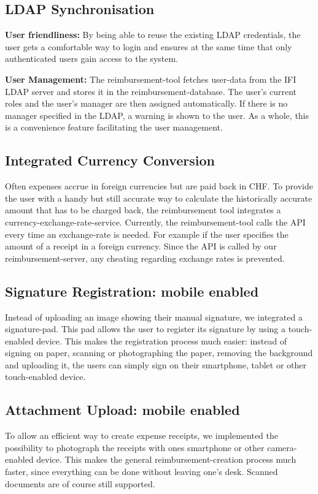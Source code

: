 \subsection{LDAP Synchronisation}
\label{feature:ldap}
\textbf{User friendliness: }By being able to reuse the existing LDAP credentials, the user gets a comfortable way to login and ensures at the same time that only authenticated users gain access to the system.\par 
\textbf{User Management: }The reimbursement-tool fetches user-data from the IFI LDAP server and stores it in the reimbursement-database. The user's current roles and the user's manager are then assigned automatically.  If there is no manager specified in the LDAP, a warning is shown to the user. As a whole, this is a convenience feature facilitating the user management.


\subsection{Integrated Currency Conversion}
\label{feature:currency}
Often expenses accrue in foreign currencies but are paid back in CHF. To provide the user with a handy but still accurate way to calculate the historically accurate amount that has to be charged back, the reimbursement tool integrates a currency-exchange-rate-service. Currently, the reimbursement-tool calls the API every time an exchange-rate is needed. For example if the user specifies the amount of a receipt in a foreign currency. Since the API is called by our reimbursement-server, any cheating regarding exchange rates is prevented.


\subsection{Signature Registration: mobile enabled}
Instead of uploading an image showing their manual signature, we integrated a signature-pad. This pad allows the user to register its signature by using a touch-enabled device. This makes the registration process much easier: instead of signing on paper, scanning or photographing the paper, removing the background and uploading it, the users can simply sign on their smartphone, tablet or other touch-enabled device.

\subsection{Attachment Upload: mobile enabled}
To allow an efficient way to create expense receipts, we implemented the possibility to photograph the receipts with ones smartphone or other camera-enabled device. This makes the general reimbursement-creation process much faster, since everything can be done without leaving one's desk. Scanned documents are of course still supported.

